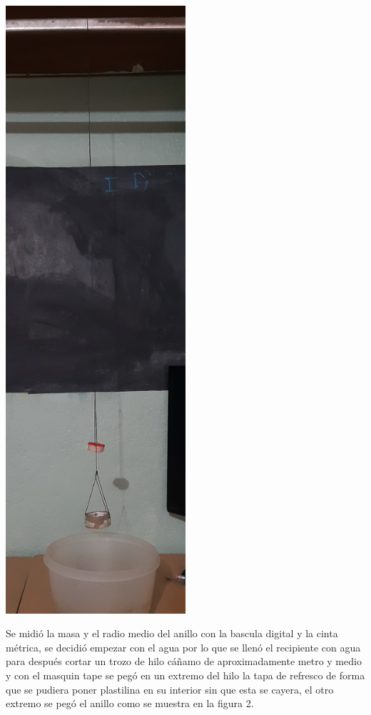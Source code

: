 \documentclass[DIV=calc, paper=a4, fontsize=11pt]{scrartcl}
\newenvironment{Figura}
  {\par\medskip\noindent\minipage{\linewidth}}
  {\endminipage\par\medskip}
\begin{document}
\begin{multicols}{2}
\begin{Figura}
\centering
    \includegraphics[width=0.5\textwidth]{20220428_164104.jpg}
    \label{fig}
\end{Figura}

Se midió la masa y el radio medio del anillo con la bascula digital y la cinta métrica, se decidió empezar con el agua por lo que se llenó el recipiente con agua para después cortar un trozo de hilo cáñamo de aproximadamente metro y medio y con el masquin tape se pegó en un extremo del hilo la tapa de refresco de forma que se pudiera poner plastilina en su interior sin que esta se cayera, el otro extremo se pegó el anillo como se muestra en la figura 2. 


\end{multicols}
\end{document}

